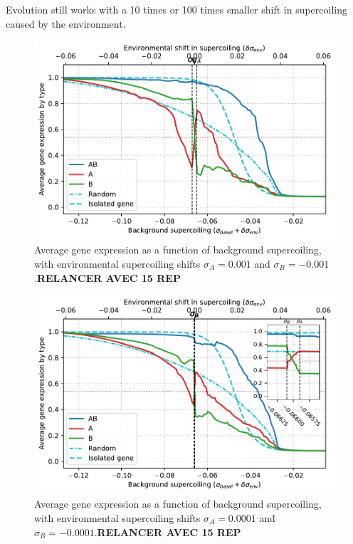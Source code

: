 Evolution still works with a 10 times or 100 times smaller shift in supercoiling caused by the environment.

\begin{figure}
\centering
\includegraphics[width=\textwidth]{param/sigma/sigma-1e-3/activity_sigmas_avg.pdf}
\caption[Average gene expression as a function of background supercoiling, with an absolute environmental supercoiling shift of 0.001]{Average gene expression as a function of background supercoiling, with environmental supercoiling shifts $\sigma_A = 0.001$ and $\sigma_B = -0.001$.\textbf{RELANCER AVEC 15 REP}}
\end{figure}

\begin{figure}
\centering
\includegraphics[width=\textwidth]{param/sigma/sigma-1e-4/activity_sigmas_avg.pdf}
\caption[Average gene expression as a function of background supercoiling, with an absolute environmental supercoiling shift of 0.0001]{Average gene expression as a function of background supercoiling, with environmental supercoiling shifts $\sigma_A = 0.0001$ and $\sigma_B = -0.0001$.\textbf{RELANCER AVEC 15 REP}}
\end{figure}

